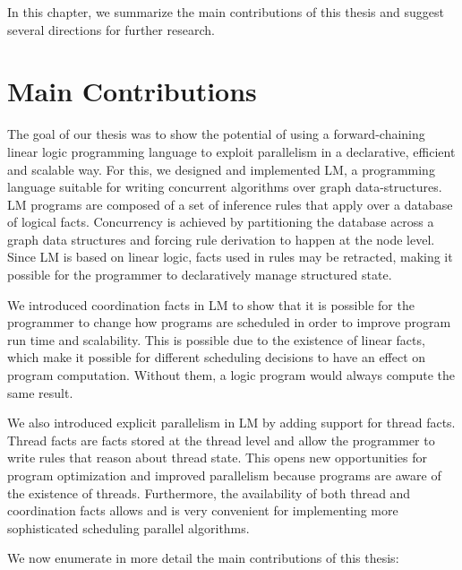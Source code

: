 
In this chapter, we summarize the main contributions of this thesis and suggest
several directions for further research.

\section{Main Contributions}

The goal of our thesis was to show the potential of using a forward-chaining
linear logic programming language to exploit parallelism in a declarative,
efficient and scalable way. For this, we designed and implemented LM, a
programming language suitable for writing concurrent algorithms over graph
data-structures. LM programs are composed of a set of inference rules that apply
over a database of logical facts. Concurrency is achieved by partitioning the
database across a graph data structures and forcing rule derivation to happen at
the node level. Since LM is based on linear logic, facts used in rules may be
retracted, making it possible for the programmer to declaratively manage
structured state.

We introduced coordination facts in LM to show that it is possible for the
programmer to change how programs are scheduled in order to improve program run
time and scalability. This is possible due to the existence of linear facts,
which make it possible for different scheduling decisions to have an effect on
program computation. Without them, a logic program would always compute the same
result.

We also introduced explicit parallelism in LM by adding support for thread
facts. Thread facts are facts stored at the thread level and allow the
programmer to write rules that reason about thread state. This opens new
opportunities for program optimization and improved parallelism because programs
are aware of the existence of threads. Furthermore, the availability of both
thread and coordination facts allows and is very convenient for implementing
more sophisticated scheduling parallel algorithms.

We now enumerate in more detail the main contributions of this thesis:

